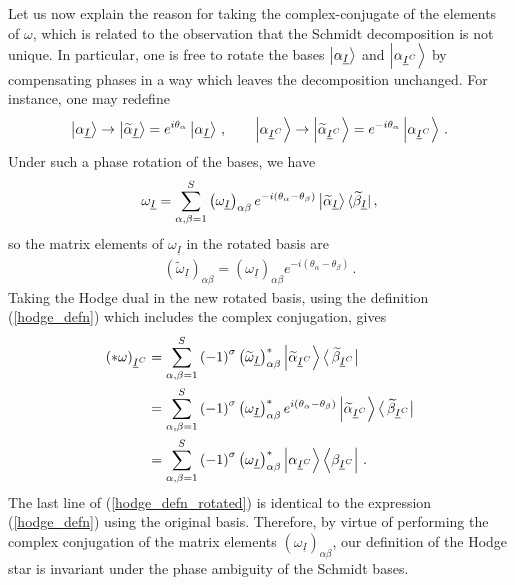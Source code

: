 \documentclass[12pt]{article}
\newcommand{\ul}[1]{{\underline{#1}}}
\numberwithin{equation}{section}
\begin{document}
Let us now explain the reason for taking the complex-conjugate of the elements of $\omega$, which is related to the observation that the Schmidt decomposition is not unique. In particular, one is free to rotate the bases $\ket{ \alpha_{\ul{I} } }$ and $\ket{\alpha_{\ul{I}^C}}$ by compensating phases in a way which leaves the decomposition unchanged. For instance, one may redefine
%
\begin{align}
    \ket{ \alpha_{\ul{I} } } \to \ket{ \widetilde{\alpha}_{\ul{I} } }  = e^{i \theta_\alpha} \ket{ \alpha_{\ul{I} } } \, , \qquad \ket{\alpha_{\ul{I}^C}} \to \ket{\widetilde{\alpha}_{\ul{I}^C}} = e^{- i \theta_\alpha} \ket{\alpha_{\ul{I}^C}} \, .
\end{align}
%
Under such a phase rotation of the bases, we have
%
\begin{align}
    \omega_{\ul{I}} = \sum_{\alpha, \beta = 1}^{S} \left( \omega_{\ul{I}} \right)_{\alpha \beta} e^{- i \left( \theta_\alpha - \theta_\beta \right) }  \ket{ \widetilde{\alpha}_{\ul{I}}} \langle \widetilde{\beta}_{\ul{I}} \vert \, ,
\end{align}
%
so the matrix elements of $\omega_{\ul{I}}$ in the rotated basis are
%
\begin{align}
    \left( \widetilde{\omega}_{\ul{I}} \right)_{\alpha \beta} = \left( \omega_{\ul{I}} \right)_{\alpha \beta} e^{- i \left( \theta_\alpha - \theta_\beta \right) } \, .
\end{align}
%
Taking the Hodge dual in the new rotated basis, using the definition (\ref{hodge_defn}) which includes the complex conjugation, gives
%
\begin{align}\label{hodge_defn_rotated}
    \left( \ast \omega \right)_{\ul{I}^C} &= \sum_{\alpha, \beta = 1}^{S} \left( - 1 \right)^\sigma \left( \widetilde{\omega}_{\ul{I}} \right)_{\alpha \beta}^\ast \ket{ \widetilde{\alpha}_{\ul{I}^C}} \big\langle \, \widetilde{\beta}_{\ul{I}^C} \big\vert \nonumber \\
    &= \sum_{\alpha, \beta = 1}^{S} \left( - 1 \right)^\sigma \left( \omega_{\ul{I}} \right)_{\alpha \beta}^\ast e^{i \left( \theta_\alpha - \theta_\beta \right) } \ket{ \widetilde{\alpha}_{\ul{I}^C}} \big\langle \, \widetilde{\beta}_{\ul{I}^C} \big\vert \nonumber \\
    &= \sum_{\alpha, \beta = 1}^{S} \left( - 1 \right)^\sigma \left( \omega_{\ul{I}} \right)_{\alpha \beta}^\ast \ket{ \alpha_{\ul{I}^C}} \bra{\beta_{\ul{I}^C}} \, .
\end{align}
%
The last line of (\ref{hodge_defn_rotated}) is identical to the expression (\ref{hodge_defn}) using the original basis. Therefore, by virtue of performing the complex conjugation of the matrix elements $\left( \omega_{\ul{I}} \right)_{\alpha \beta}$, our definition of the Hodge star is invariant under the phase ambiguity of the Schmidt bases.
\end{document}
